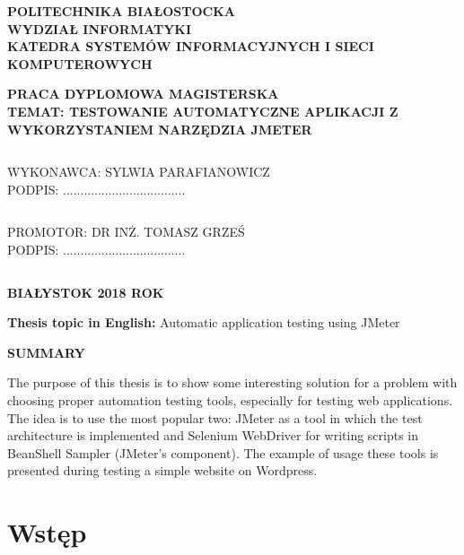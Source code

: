 \documentclass[12pt]{report}
\theoremstyle{definition}
\begin{document}
\begin{titlepage}
\begin{center}
{\Large\bf{POLITECHNIKA BIAŁOSTOCKA} }
$$ \,$$
{\Large\bf{ WYDZIAŁ INFORMATYKI}}
$$ \,$$
  \bf{ KATEDRA SYSTEMÓW INFORMACYJNYCH I SIECI KOMPUTEROWYCH }
\end{center}
\begin{center}
$$ \,$$
$$ \,$$
{\Large \bf{PRACA DYPLOMOWA MAGISTERSKA}}
$$ \,$$
{\Large \bf{ TEMAT: TESTOWANIE AUTOMATYCZNE APLIKACJI Z WYKORZYSTANIEM NARZĘDZIA JMETER}}\\
\end{center}
$$ \,$$
$$ \,$$
$$ \,$$
$$ \,$$
$$ \,$$
\begin{large}
\begin{flushright}
WYKONAWCA: SYLWIA PARAFIANOWICZ\\
$$ \,$$
PODPIS: ...................................\
\end{flushright}
$$ \,$$
$$ \,$$
\end{large}
\begin{large}
PROMOTOR: DR INŻ. TOMASZ GRZEŚ\\
$$ \,$$
PODPIS: ...................................\
\end{large}
$$ \,$$
\begin{center}
{\large \bf {BIA\L{YSTOK} 2018 ROK} }
\end{center}
\end{titlepage}




\setcounter{page}{3}
\textbf{Thesis topic in English:} Automatic application testing using JMeter\\
\begin{center}
	\textbf{SUMMARY}
\end{center}

The purpose of this thesis is to show some interesting solution for a problem with choosing proper automation testing tools, especially for testing web applications. The idea is to use the most popular two: JMeter as a tool in which the test architecture is implemented and Selenium WebDriver for writing scripts in BeanShell Sampler (JMeter's component). The example of usage these tools is presented during testing a simple website on Wordpress.

\newpage



\setcounter{page}{5}
\tableofcontents

\newpage
\chapter{Wstęp} 
\end{document}

